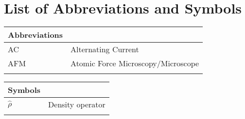 %
%

\chapter[List of Abbreviations and Symbols]{List of Abbreviations and Symbols}


\begin{center}
	\small
	\begin{longtable}{ll}
	\toprule
	Abbreviations & {} \\
	\bottomrule
	AC				& Alternating Current \\
	AFM				& Atomic Force Microscopy/Microscope \\
	\etc{}		&	\etc{} \\
	\hline
	\end{longtable}
\end{center}

\begin{center}
	\small
	\begin{longtable}{ll}
	\toprule
	Symbols & {} \\
	\bottomrule
	$\hat{\rho}$		& Density operator \\
	\etc{}					& \etc{} \\
	\hline
	\end{longtable}
\end{center}

